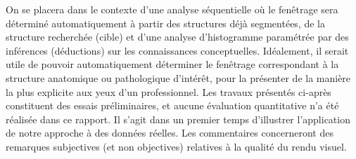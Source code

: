 	On se placera dans le contexte d'une analyse séquentielle où le fenêtrage sera déterminé automatiquement à partir des structures déjà segmentées, de la structure recherchée (cible) et d'une analyse d'histogramme paramétrée par des inférences (déductions) sur les connaissances conceptuelles. Idéalement, il serait utile de pouvoir automatiquement déterminer le fenêtrage correspondant à la structure anatomique ou pathologique d'intérêt, pour la présenter de la manière la plus explicite aux yeux d'un professionnel. Les travaux présentés ci-après constituent des essais préliminaires, et aucune évaluation quantitative n'a été réalisée dans ce rapport. Il s'agit dans un premier temps d'illustrer l'application de notre approche à des données réelles. Les commentaires concerneront des remarques subjectives (et non objectives) relatives à la qualité du rendu visuel.	


	



		
		
